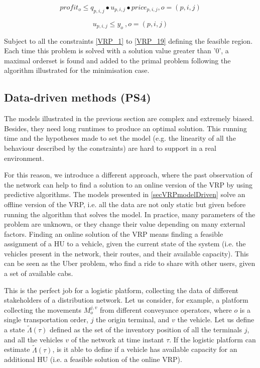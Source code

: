 \begin{equation}
    profit_o\le q_{p,i,j}\bullet u_{p,i,j}\bullet price_{p,i,j} , o=\left(p,i,j\right)
\end{equation}

\begin{equation}
    u_{p,i,j}\le y_o\ , o=\left(p,i,j\right)
\end{equation}

Subject to all the constraints \ref{VRP_1} to \ref{VRP_19} defining the feasible region. Each time this problem is solved with a solution value greater than '0', a maximal orderset is found and added to the primal problem following the algorithm illustrated for the minimisation case.

\subsection{Data-driven methods (PS4)} \label{secDataDrivenRouting}

The models illustrated in the previous section are complex and extremely biased. Besides, they need long runtimes to produce an optimal solution. This running time and the hypotheses made to set the model (e.g. the linearity of all the behaviour described by the constraints) are hard to support in a real environment. \par

For this reason, we introduce a different approach, where the past observation of the network can help to find a solution to an online version of the VRP by using predictive algorithms. The models presented in \ref{secVRPmodelDriven} solve an offline version of the VRP, i.e. all the data are not only static but given before running the algorithm that solves the model. In practice, many parameters of the problem are unknown, or they change their value depending on many external factors. Finding an online solution of the VRP means finding a feasible assignment of a HU to a vehicle, given the current state of the system (i.e. the vehicles present in the network, their routes, and their available capacity). This can be seen as the Uber problem, who find a ride to share with other users, given a set of available cabs.\par

This is the perfect job for a logistic platform, collecting the data of different stakeholders of a distribution network. Let us consider, for example, a platform collecting the movements $M_o^{j,v}$ from different conveyance operators, where $o$ is a single transportation order, $j$ the origin terminal, and $v$ the vehicle. Let us define a state $\widetilde{\Lambda}(\tau)$ defined as the set of the inventory position of all the terminals $j$, and all the vehicles $v$ of the network at time instant $\tau$. If the logistic platform can estimate $\widetilde{\Lambda}(\tau)$, is it able to define if a vehicle has available capacity for an additional HU (i.e. a feasible solution of the online VRP). \par

